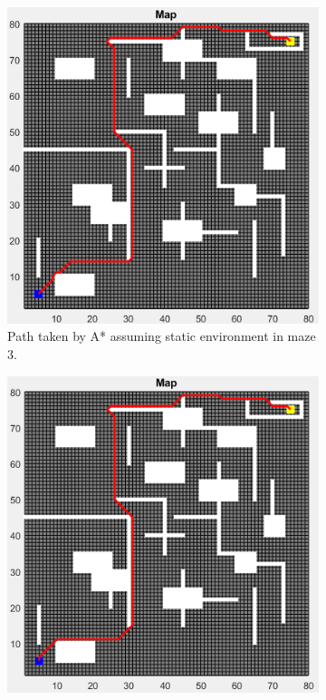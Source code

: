 \begin{figure}
	\centering
    \begin{subfigure}[t]{0.32\columnwidth}
		\centering
		\includegraphics[width=\textwidth]{images/a_star_static_maze_3.png}
		\caption{Path taken by A* assuming static environment in maze 3.}
        \label{fig:a_star_static_path_maze_3}
	\end{subfigure}
    \hfill
	\begin{subfigure}[t]{0.32\columnwidth}
		\centering
		\includegraphics[width=\textwidth]{images/dijkstra_static_maze_3.png}

\end{subfigure}
\end{figure}
